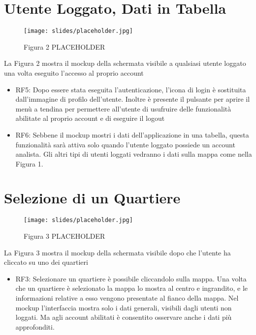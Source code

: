\section{Utente Loggato, Dati in Tabella}

    \begin{figure}
        \texttt{[image: slides/placeholder.jpg]} %
        \caption{Figura 2 PLACEHOLDER}
    \end{figure}    

    La Figura 2 mostra il mockup della schermata visibile a qualsiasi utente loggato una volta eseguito l'accesso al proprio account

    \begin{itemize}
        \item RF5: Dopo essere stata eseguita l'autenticazione, l'icona di login è sostituita dall'immagine di profilo dell'utente. Inoltre è presente il pulsante per aprire il menù a tendina per permettere all'utente di usufruire delle funzionalità abilitate al proprio account e di eseguire il logout
        \item RF6: Sebbene il mockup mostri i dati dell'applicazione in una tabella, questa funzionalità sarà attiva solo quando l'utente loggato possiede un account analista. Gli altri tipi di utenti loggati vedranno i dati sulla mappa come nella Figura 1.
    \end{itemize}




\section{Selezione di un Quartiere}

    \begin{figure}
        \texttt{[image: slides/placeholder.jpg]} %
        \caption{Figura 3 PLACEHOLDER}
    \end{figure}    

    La Figura 3 mostra il mockup della schermata visibile dopo che l'utente ha cliccato su uno dei quartieri

    \begin{itemize}
        \item RF3: Selezionare un quartiere è possibile cliccandolo sulla mappa. Una volta che un quartiere è selezionato la mappa lo mostra al centro e ingrandito, e le informazioni relative a esso vengono presentate al fianco della mappa. Nel mockup l'interfaccia mostra solo i dati generali, visibili dagli utenti non loggati. Ma agli account abilitati è consentito osservare anche i dati più approfonditi.
    \end{itemize}


